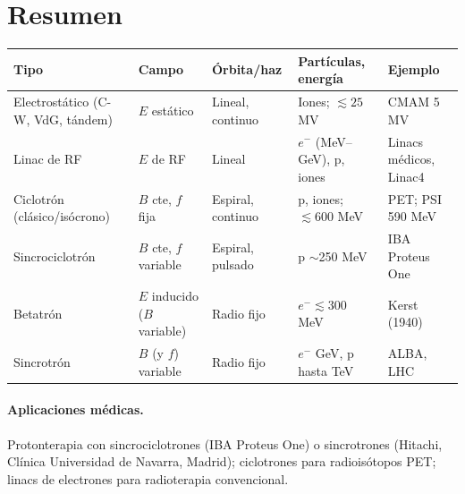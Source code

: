 \section{Resumen}
\begin{clave}
\begin{center}\footnotesize
\begin{tabularx}{\linewidth}{>{\raggedright}p{2.6cm}>{\raggedright}p{2.1cm}>{\raggedright}p{2.0cm}>{\raggedright}X>{\raggedright\arraybackslash}p{2.4cm}}
\toprule
Tipo & Campo & Órbita/haz & Partículas, energía & Ejemplo\\
\midrule
Electrostático (C-W, VdG, tándem) & $E$ estático & Lineal, continuo & Iones; $\lesssim25$ MV & CMAM 5 MV\\
Linac de RF & $E$ de RF & Lineal & $e^-$ (MeV--GeV), p, iones & Linacs médicos, Linac4\\
Ciclotrón (clásico/isócrono) & $B$ cte, $f$ fija & Espiral, continuo & p, iones; $\lesssim600$ MeV & PET; PSI 590 MeV\\
Sincrociclotrón & $B$ cte, $f$ variable & Espiral, pulsado & p $\sim$250 MeV & IBA Proteus One\\
Betatrón & $E$ inducido ($B$ variable) & Radio fijo & $e^-\lesssim300$ MeV & Kerst (1940)\\
Sincrotrón & $B$ (y $f$) variable & Radio fijo & $e^-$ GeV, p hasta TeV & ALBA, LHC\\
\bottomrule
\end{tabularx}
\end{center}
\end{clave}

\paragraph{Aplicaciones médicas.} Protonterapia con sincrociclotrones (IBA Proteus One) o sincrotrones (Hitachi, Clínica Universidad de Navarra, Madrid);
ciclotrones para radioisótopos PET; linacs de electrones para radioterapia convencional.
